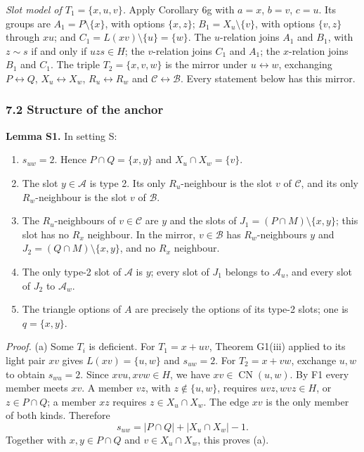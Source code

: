 \emph{Slot model of $T_1=\{x,u,v\}$.} Apply Corollary 6g with $a=x$, $b=v$, $c=u$. Its groups are $A_1=P\setminus\{x\}$, with options $\{x,z\}$; $B_1=X_u\setminus\{v\}$, with options $\{v,z\}$ through $xu$; and $C_1=L(xv)\setminus\{u\}=\{w\}$. The $u$-relation joins $A_1$ and $B_1$, with $z\sim s$ if and only if $uzs\in H$; the $v$-relation joins $C_1$ and $A_1$; the $x$-relation joins $B_1$ and $C_1$. The triple $T_2=\{x,v,w\}$ is the mirror under $u\leftrightarrow w$, exchanging $P\leftrightarrow Q$, $X_u\leftrightarrow X_w$, $R_u\leftrightarrow R_w$ and $\mathcal C\leftrightarrow\mathcal B$. Every statement below has this mirror.

\subsubsection*{7.2 Structure of the anchor}
\textbf{Lemma S1.} In setting S:
\begin{enumerate}
\item[(a)] $s_{uw}=2$. Hence $P\cap Q=\{x,y\}$ and $X_u\cap X_w=\{v\}$.
\item[(b)] The slot $y\in\mathcal A$ is type 2. Its only $R_u$-neighbour is the slot $v$ of $\mathcal C$, and its only $R_w$-neighbour is the slot $v$ of $\mathcal B$.
\item[(c)] The $R_u$-neighbours of $v\in\mathcal C$ are $y$ and the slots of $J_1=(P\cap M)\setminus\{x,y\}$; this slot has no $R_x$ neighbour. In the mirror, $v\in\mathcal B$ has $R_w$-neighbours $y$ and $J_2=(Q\cap M)\setminus\{x,y\}$, and no $R_x$ neighbour.
\item[(d)] The only type-2 slot of $\mathcal A$ is $y$; every slot of $J_1$ belongs to $\mathcal A_u$, and every slot of $J_2$ to $\mathcal A_w$.
\item[(e)] The triangle options of $A$ are precisely the options of its type-2 slots; one is $q=\{x,y\}$.
\end{enumerate}
\emph{Proof.} (a) Some $T_i$ is deficient. For $T_1=x+uv$, Theorem G1(iii) applied to its light pair $xv$ gives $L(xv)=\{u,w\}$ and $s_{uw}=2$. For $T_2=x+vw$, exchange $u,w$ to obtain $s_{wu}=2$. Since $xvu,xvw\in H$, we have $xv\in\operatorname{CN}(u,w)$. By F1 every member meets $xv$. A member $vz$, with $z\notin\{u,w\}$, requires $uvz,wvz\in H$, or $z\in P\cap Q$; a member $xz$ requires $z\in X_u\cap X_w$. The edge $xv$ is the only member of both kinds. Therefore
\[
 s_{uw}=|P\cap Q|+|X_u\cap X_w|-1.
\]
Together with $x,y\in P\cap Q$ and $v\in X_u\cap X_w$, this proves (a).

